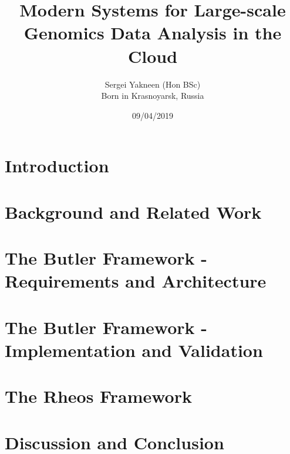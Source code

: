 \documentclass[12pt, a4paper, twoside]{book}
\title{
	{Modern Systems for Large-scale Genomics Data Analysis in the Cloud}\\
}
\author{Sergei Yakneen (Hon BSc)\\ Born in Krasnoyarsk, Russia\\}
\date{09/04/2019}
\begin{document}
\frontmatter
	\renewcommand{\headrulewidth}{0pt}
	
	
	
	
	
	\tableofcontents

\mainmatter
	\renewcommand{\headrulewidth}{0.5pt}
	\chapter{Introduction} \label{ch:introduction}
	

	\chapter{Background and Related Work} \label{ch:background}
	
		
	\chapter[Butler - Requirements and Architecture]{The Butler Framework - Requirements and Architecture} \label{ch:butler_architecture}
	

	\chapter[Butler - Implementation and Validation]{The Butler Framework - Implementation and Validation} \label{ch:butler_implementation}
	

	\chapter{The Rheos Framework} \label{ch:rheos_framework}
	

	\chapter{Discussion and Conclusion} \label{ch:conclusion}
	

\backmatter
	\label{ch:appendices}
	
	\printbibliography
\end{document}

